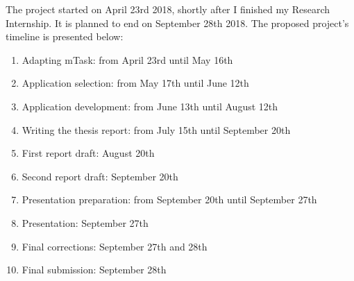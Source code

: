 \documentclass{article}
\begin{document}
The project started on April 23rd 2018, shortly after I finished my Research Internship. It is planned to end on September 28th 2018. The proposed project's timeline is presented below:

\begin{enumerate}
    \item Adapting mTask: from April 23rd until May 16th
    \item Application selection: from May 17th until June 12th 
    \item Application development: from June 13th until August 12th
    \item Writing the thesis report: from July 15th until September 20th
    \item First report draft: August 20th
    \item Second report draft: September 20th
    \item Presentation preparation: from September 20th until September 27th
    \item Presentation: September 27th
    \item Final corrections: September 27th and 28th
    \item Final submission: September 28th
\end{enumerate}


\end{document}
